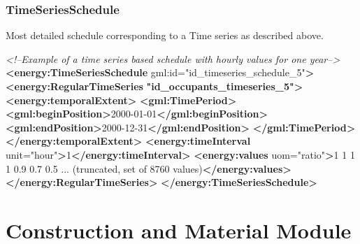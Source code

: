 \documentclass[a4paper,12pt]{article}
\newenvironment{Shaded}{}{}
\newcommand{\KeywordTok}[1]{\textcolor[rgb]{0.00,0.44,0.13}{\textbf{{#1}}}}
\newcommand{\StringTok}[1]{\textcolor[rgb]{0.25,0.44,0.63}{{#1}}}
\newcommand{\CommentTok}[1]{\textcolor[rgb]{0.38,0.63,0.69}{\textit{{#1}}}}
\newcommand{\OtherTok}[1]{\textcolor[rgb]{0.00,0.44,0.13}{{#1}}}
\newcommand{\ErrorTok}[1]{\textcolor[rgb]{1.00,0.00,0.00}{\textbf{{#1}}}}
\newcommand{\NormalTok}[1]{{#1}}
\let\stdsection\section%
\renewcommand\section{\newpage\stdsection}
\begin{document}
\subsubsection{TimeSeriesSchedule}\label{timeseriesschedule}

Most detailed schedule corresponding to a Time series as described
above.

\begin{Shaded}
\begin{Highlighting}[]
\CommentTok{<!--Example of a time series based schedule with hourly values for one year-->}
\KeywordTok{<energy:TimeSeriesSchedule}\OtherTok{ gml:id=}\StringTok{"id_timeseries_schedule_5"}\KeywordTok{>}
    \KeywordTok{<energy:RegularTimeSeries} \ErrorTok{"id_occupants_timeseries_5"}\KeywordTok{>}
            \KeywordTok{<energy:temporalExtent>}
                \KeywordTok{<gml:TimePeriod>}
                    \KeywordTok{<gml:beginPosition>}\NormalTok{2000-01-01}\KeywordTok{</gml:beginPosition>}
                    \KeywordTok{<gml:endPosition>}\NormalTok{2000-12-31}\KeywordTok{</gml:endPosition>}
                \KeywordTok{</gml:TimePeriod>}
            \KeywordTok{</energy:temporalExtent>}
            \KeywordTok{<energy:timeInterval}\OtherTok{ unit=}\StringTok{"hour"}\KeywordTok{>}\NormalTok{1}\KeywordTok{</energy:timeInterval>}
            \KeywordTok{<energy:values}\OtherTok{ uom=}\StringTok{"ratio"}\KeywordTok{>}\NormalTok{1 1 1 1 0.9 0.7 0.5 ... (truncated, set of 8760 values)}\KeywordTok{</energy:values>}
    \KeywordTok{</energy:RegularTimeSeries>}
\KeywordTok{</energy:TimeSeriesSchedule>}
\end{Highlighting}
\end{Shaded}

\section{Construction and Material
Module}\label{construction-and-material-module}
\end{document}
